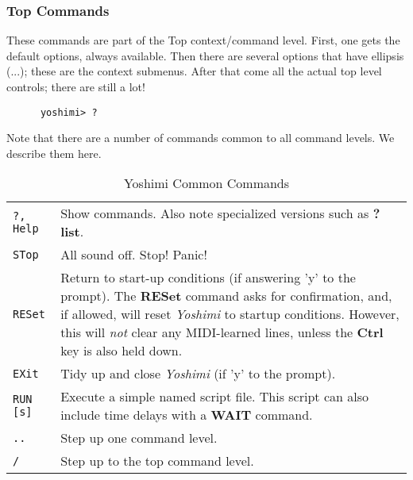 \subsubsection{Top Commands}
\label{subsec:command_line_top_command_list}

   These commands are part of the Top context/command level.
   First, one gets the default options, always available.
   Then there are several options that have ellipsis (...);
   these are the context submenus.
   After that come all the actual top level controls; there are still a lot!

   \begin{verbatim}
      yoshimi> ?
   \end{verbatim}

   Note that there are a number of commands common to all command levels.
   We describe them here.

\begin{center}
\begin{longtable}{p{2cm} p{10cm}}
\caption[Yoshimi Common Commands]{Yoshimi Common Commands} \\

\texttt{?,  Help} &
   Show commands.  Also note specialized versions such as \textbf{? list}. \\
\texttt{STop} &
   All sound off.  Stop!  Panic! \\
\texttt{RESet} &
   Return to start-up conditions (if answering 'y' to the prompt).
   The \textbf{RESet} command asks for confirmation, and, if allowed, will
   reset \textsl{Yoshimi} to startup conditions.
   However, this will \textsl{not} clear any MIDI-learned lines, unless the \textbf{Ctrl} key is also held down.\\
\texttt{EXit} &
   Tidy up and close \textsl{Yoshimi} (if 'y' to the prompt). \\
\texttt{RUN [s]} &
   Execute a simple named script file.
   This script can also include time delays with a \textbf{WAIT} command.\\
\texttt{..} &
   Step up one command level. \\
\texttt{/} &
   Step up to the top command level. \\

\end{longtable}
\end{center}

